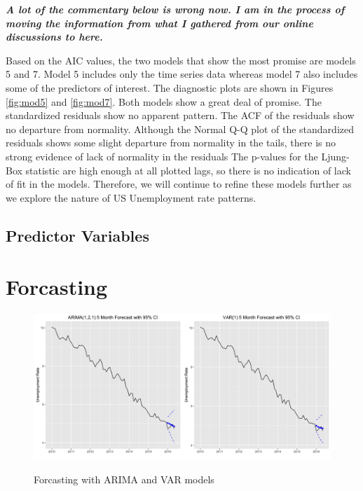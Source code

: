 \documentclass[twoside,twocolumn]{article}
\begin{document}
		
	\textbf{\textit{A lot of the commentary below is wrong now.  I am in the process of moving the information from what I gathered from our online discussions to here.}}
	
		Based on the AIC values, the two models that show the most promise are models 5 and 7.  Model 5 includes only the time series data whereas model 7 also includes some of the predictors of interest.  The diagnostic plots are shown in Figures \ref{fig:mod5} and \ref{fig:mod7}. Both models show a great deal of promise.  The standardized residuals show no apparent pattern. The ACF of the residuals show no departure from normality. Although the Normal Q-Q plot of the standardized residuals shows some slight departure from normality in the tails, there is no strong evidence of lack of normality in the residuals  The p-values for the  Ljung-Box statistic are high enough at all plotted lags, so there is no indication of lack of fit in the models. Therefore, we will continue to refine these models further as we explore the nature of US Unemployment rate patterns.


\subsection{Predictor Variables}

\blindtext %

\section{Forcasting}

 \begin{figure}[H]
    	\centering
     	\caption{Forcasting with ARIMA and VAR models}
     	\includegraphics[width=\linewidth]{images/forcasts}
     	\label{fig:forcasts}
      \end{figure}
      
\end{document}
